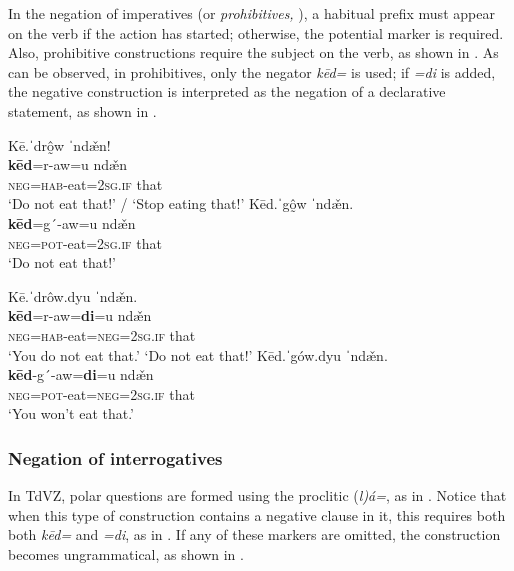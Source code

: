 \documentclass[output=paper,colorlinks=true, citecolor=brown]{langscibook}
\begin{document}
In the negation of imperatives (or \textit{prohibitives,} \citealt{AuweraEtAl2013}), a habitual prefix must appear on the verb if the action has started; otherwise, the potential marker is required. Also, prohibitive constructions require the subject on the verb, as shown in . As can be observed, in prohibitives, only the negator \textit{kēd=} is used; if \textit{=di} is added, the negative construction is interpreted as the negation of a declarative statement, as shown in .

\ea\label{ex:zap:26}
    \ea\label{ex:zap:26a}
        \glll   Kē.ˈdrô̰w ˈnd\v{æ}n!\\ 
              \textbf{kēd}=r-aw=u nd\v{æ}n\\
              \textsc{neg}=\textsc{hab}{}-eat=\textsc{2sg.if} that\\
        \glt  ‘Do not eat that!’ / ‘Stop eating that!’
    \ex\label{ex:zap:26b}
        \glll  Kēd.ˈgô̰w ˈnd\v{æ}n.\\
             \textbf{kēd}=g´-aw=u nd\v{æ}n\\
              \textsc{neg}=\textsc{pot}{}-eat=\textsc{2sg.if} that\\
        \glt ‘Do not eat that!’
    \z
\z 

\ea\label{ex:zap:27}
    \ea\label{ex:zap:27a}
        \glll  Kē.ˈdrôw.dyu ˈnd\v{æ}n.\\ 
               \textbf{kēd}=r-aw=\textbf{di}=u nd\v{æ}n\\
               \textsc{neg}=\textsc{hab}{}-eat=\textsc{neg}=\textsc{2sg.if} that\\
        \glt  ‘You do not eat that.’ 
        \glt *‘Do not eat that!’ 
    \ex\label{ex:zap:27b}
        \glll  Kēd.ˈgów.dyu ˈnd\v{æ}n.\\
             \textbf{kēd}{}-g´-aw=\textbf{di}=u nd\v{æ}n\\
              \textsc{neg}=\textsc{pot}{}-eat=\textsc{neg}=\textsc{2sg.if} that\\
        \glt  ‘You won’t eat that.’
    \z
\z

\subsubsection{Negation of interrogatives}\label{sec:zap:2.2.2}

In TdVZ, polar questions are formed using the proclitic (\textit{l)á=}, as in . Notice that when this type of construction contains a negative clause in it, this requires both both \textit{kēd=} and \textit{=di}, as in . If any of these markers are omitted, the construction becomes ungrammatical, as shown in . 
\end{document}
